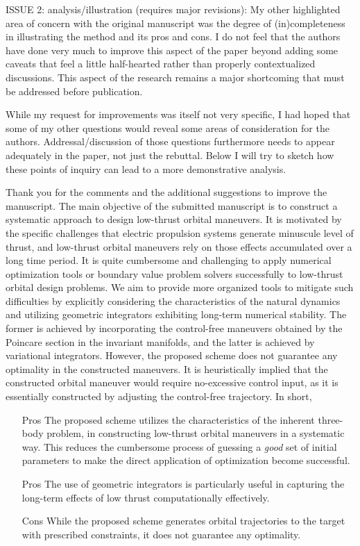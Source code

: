 \documentclass[11pt]{article}
\begin{document}
\begin{itshape}
ISSUE 2: analysis/illustration (requires major revisions): 
My other highlighted area of concern with the original manuscript was the degree of (in)completeness in illustrating the method and its pros and cons.  I do not feel that the authors have done very much to improve this aspect of the paper beyond adding some caveats that feel a little half-hearted rather than properly contextualized discussions.  This aspect of the research remains a major shortcoming that must be addressed before publication.  

While my request for improvements was itself not very specific, I had hoped that some of my other questions would reveal some areas of consideration for the authors.  Addressal/discussion of those questions furthermore needs to appear adequately in the paper, not just the rebuttal. Below I will try to sketch how these points of inquiry can lead to a more demonstrative analysis.
\end{itshape}
\newline\newline
Thank you for the comments and the additional suggestions to improve the manuscript. 
The main objective of the submitted manuscript is to construct a systematic approach to design low-thrust orbital maneuvers. 
It is motivated by the specific challenges that electric propulsion systems generate minuscule level of thrust, and low-thrust orbital maneuvers rely on those effects accumulated over a long time period. 
It is quite cumbersome and challenging to apply numerical optimization tools or boundary value problem solvers successfully to low-thrust orbital design problems. 
We aim to provide more organized tools to mitigate such difficulties by explicitly considering the characteristics of the natural dynamics and utilizing geometric integrators exhibiting long-term numerical stability. 
The former is achieved by incorporating the control-free maneuvers obtained by the Poincare section in the invariant manifolds, and the latter is achieved by variational integrators. 
However, the proposed scheme does not guarantee any optimality in the constructed maneuvers. 
It is heuristically implied that the constructed orbital maneuver would require no-excessive control input, as it is essentially constructed by adjusting the control-free trajectory. 
In short,
\begin{itemize}
	\item[Pros] The proposed scheme utilizes the characteristics of the inherent three-body problem, in constructing low-thrust orbital maneuvers in a systematic way. 
		This reduces the cumbersome process of guessing a \textit{good} set of initial parameters to make the direct application of optimization become successful. 
	\item[Pros] The use of geometric integrators is particularly useful in capturing the long-term effects of low thrust computationally effectively. 
	\item[Cons] While the proposed scheme generates orbital trajectories to the target with prescribed constraints, it does not guarantee any optimality. 
\end{itemize}
\end{document}
